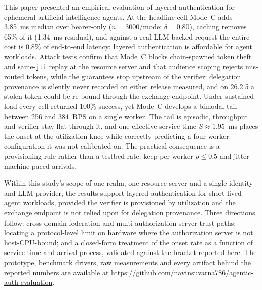 \documentclass[conference]{IEEEtran}
\begin{document}
This paper presented an empirical evaluation of layered authentication for ephemeral artificial intelligence agents. At the headline cell Mode~C adds 3.85~ms median over bearer-only ($n=3000$/mode; $\delta=0.80$), caching removes 65\% of it (1.34~ms residual), and against a real LLM-backed request the entire cost is 0.8\% of end-to-end latency: layered authentication is affordable for agent workloads. Attack tests confirm that Mode~C blocks chain-spawned token theft and same-\texttt{jti} replay at the resource server and that audience scoping rejects mis-routed tokens, while the guarantees stop upstream of the verifier: delegation provenance is silently never recorded on either release measured, and on 26.2.5 a stolen token could be re-bound through the exchange endpoint. Under sustained load every cell returned 100\% success, yet Mode~C develops a bimodal tail between 256 and 384~RPS on a single worker. The tail is episodic, throughput and verifier stay flat through it, and one effective service time $S \approx 1.95$~ms places the onset at the utilization knee while correctly predicting a four-worker configuration it was not calibrated on. The practical consequence is a provisioning rule rather than a testbed rate: keep per-worker $\rho \le 0.5$ and jitter machine-paced arrivals.

Within this study's scope of one realm, one resource server and a single identity and LLM provider, the results support layered authentication for short-lived agent workloads, provided the verifier is provisioned by utilization and the exchange endpoint is not relied upon for delegation provenance. Three directions follow: cross-domain federation and multi-authorization-server trust paths; locating a protocol-level limit on hardware where the authorization server is not host-CPU-bound; and a closed-form treatment of the onset rate as a function of service time and arrival process, validated against the bracket reported here. The prototype, benchmark drivers, raw measurements and every artifact behind the reported numbers are available at \url{https://github.com/navinsuvarna786/agentic-auth-evaluation}.



\end{document}
